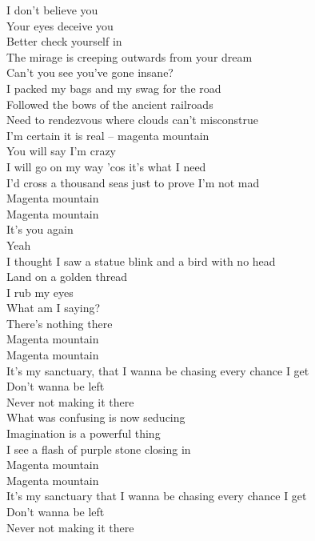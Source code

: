 I don't believe you \\
Your eyes deceive you \\
Better check yourself in \\
The mirage is creeping outwards from your dream \\
Can't you see you've gone insane? \\

I packed my bags and my swag for the road \\
Followed the bows of the ancient railroads \\
Need to rendezvous where clouds can't misconstrue \\
I'm certain it is real -- magenta mountain \\

You will say I'm crazy \\
I will go on my way 'cos it's what I need \\
I'd cross a thousand seas just to prove I'm not mad \\
Magenta mountain \\

Magenta mountain \\

It's you again \\
Yeah \\
I thought I saw a statue blink and a bird with no head \\
Land on a golden thread \\
I rub my eyes \\
What am I saying? \\
There's nothing there \\

Magenta mountain \\
Magenta mountain \\
It's my sanctuary, that I wanna be chasing every chance I get \\
Don't wanna be left \\
Never not making it there \\

What was confusing is now seducing \\
Imagination is a powerful thing \\
I see a flash of purple stone closing in \\

Magenta mountain \\
Magenta mountain \\
It's my sanctuary that I wanna be chasing every chance I get \\
Don't wanna be left \\
Never not making it there \\

